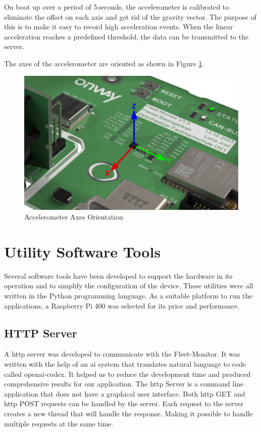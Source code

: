 On boot up over a period of 5\,seconds, the accelerometer is calibrated to eliminate the offset on each axis and get rid of the gravity vector. The purpose of this is to make it easy to record high acceleration events. When the linear acceleration reaches a predefined threshold, the data can be transmitted to the server.

The axes of the accelerometer are oriented as shown in Figure \ref{fig:accel-axis}.

\begin{figure}[h!]
	\centering
	\includegraphics[width=\textwidth]{images/Accel-axis}
	\caption{Accelerometer Axes Orientation}
	\label{fig:accel-axis}
\end{figure}

\newpage
\section{Utility Software Tools}
Several software tools have been developed to support the hardware in its operation and to simplify the configuration of the device. These utilities were all written in the Python programming language. As a suitable platform to run the applications, a Raspberry Pi 400 was selected for its price and performance.

\subsection{HTTP Server}
A \acrshort{http} server was developed to communicate with the Fleet-Monitor. It was written with the help of an \acrshort{ai} system that translates natural language to code called \gls{openai-codex}. It helped us to reduce the development time and produced comprehensive results for our application. The \acrshort{http} Server is a command line application that does not have a graphical user interface. Both \acrshort{http} GET and \acrshort{http} POST requests can be handled by the server. Each request to the server creates a new thread that will handle the response. Making it possible to handle multiple requests at the same time.

